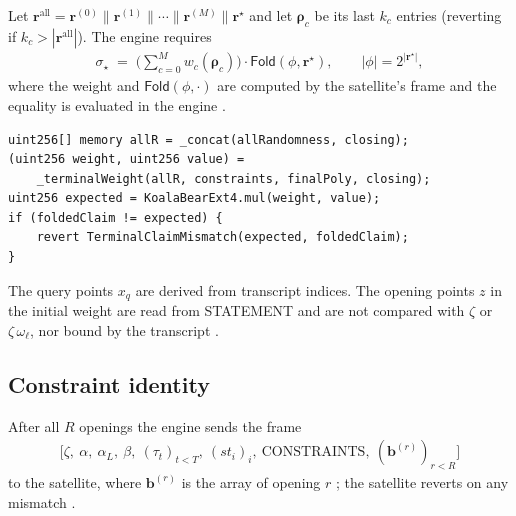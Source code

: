 \begin{property}
\label{prop:sv-terminal}
Let $\mathbf r^{\mathrm{all}} = \mathbf r^{(0)} \| \mathbf r^{(1)} \| \cdots \|
\mathbf r^{(M)} \| \mathbf r^\star$ and let $\boldsymbol\rho_c$ be its last $k_c$
entries (reverting if $k_c > |\mathbf r^{\mathrm{all}}|$). The engine requires
\begin{align}
  \sigma_\star \;=\; \Big(\sum_{c=0}^{M} w_c(\boldsymbol\rho_c)\Big) \cdot
  \mathsf{Fold}(\phi, \mathbf r^\star), \qquad |\phi| = 2^{|\mathbf r^\star|},
\end{align}
where the weight and $\mathsf{Fold}(\phi,\cdot)$ are computed by the satellite's
 frame and the equality is evaluated in the engine
 
 .
\end{property}

\begin{Verbatim}[fontsize=\small]
uint256[] memory allR = _concat(allRandomness, closing);
(uint256 weight, uint256 value) =
    _terminalWeight(allR, constraints, finalPoly, closing);
uint256 expected = KoalaBearExt4.mul(weight, value);
if (foldedClaim != expected) {
    revert TerminalClaimMismatch(expected, foldedClaim);
}
\end{Verbatim}

The query points $x_q$ are derived from transcript indices. The opening points $z$
in the initial weight are read from STATEMENT and are not compared with $\zeta$
or $\zeta\,\omega_{\ell}$, nor bound by the transcript .

\subsection{Constraint identity}
\label{subsec:sv-cidnty}

After all $R$ openings the engine sends the  frame
\begin{align}
  \big[\zeta,\ \alpha,\ \alpha_L,\ \beta,\ (\tau_t)_{t<T},\ (\mathit{st}_i)_i,\
  \text{CONSTRAINTS},\ (\mathbf b^{(r)})_{r<R}\big]
\end{align}
to the satellite, where $\mathbf b^{(r)}$ is the
 array of opening $r$ ;
the satellite reverts on any mismatch \src{TerminalWeight.sol:998-1194}.

